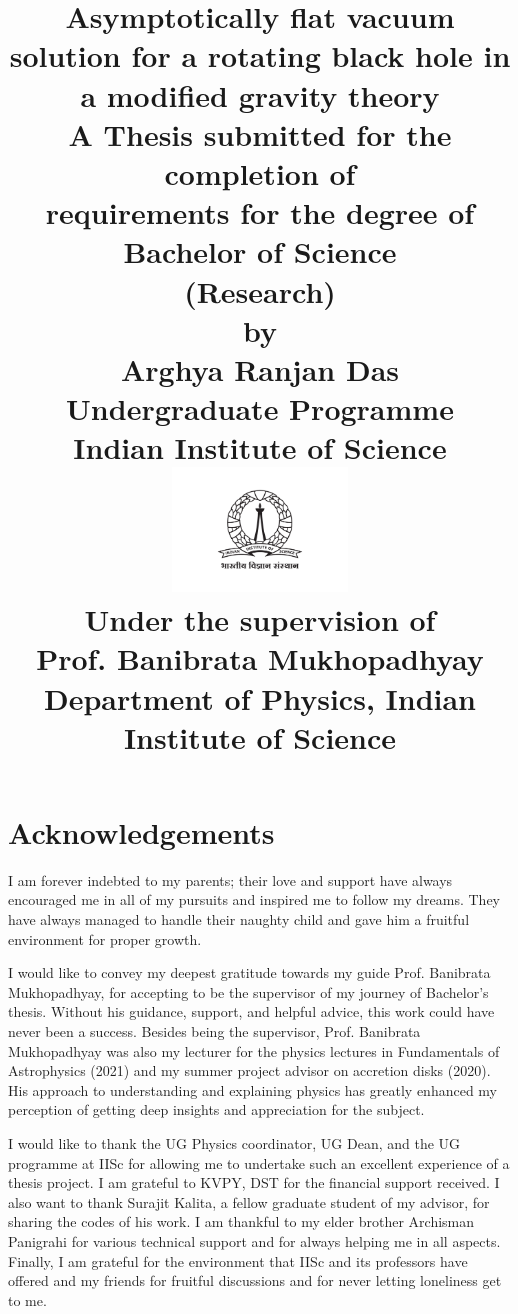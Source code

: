 \documentclass[12pt,a4paper,oneside]{book}
\title{
\sc
\Huge{Asymptotically flat vacuum solution for a rotating black hole in a modified  gravity theory}
\\[40pt]
\large{A Thesis submitted for the completion of}
\\[5pt]
\large{requirements for the degree of}
\\[15pt]
\Large{Bachelor of Science}
\\[5pt]
\Large{(Research)}
\\[20pt]
\normalsize{by}
\\[15pt]
\large{Arghya Ranjan Das}
\\[5pt]
\normalsize{Undergraduate Programme}
\\[5pt]
\normalsize{Indian Institute of Science}
\\[30pt]
\includegraphics[width=0.35\textwidth]{University_logo.pdf}
\\[40pt]
\normalsize{Under the supervision of}
\\[10pt]
\large{Prof. Banibrata Mukhopadhyay}\\
\normalsize{Department of Physics, Indian Institute of Science} \\[5pt]
\newpage
}
\author{}
\date{}
\begin{document}
\begin{titlepage}
\maketitle
\end{titlepage}
\frontmatter


\chapter*{\centering Acknowledgements}
    \hspace{15pt} 
      I am forever indebted to my parents; their love and support have always encouraged me in all of my pursuits and inspired me to follow my dreams. They have always managed to handle their naughty child and gave him a fruitful environment for proper growth.
    
    I would like to convey my deepest gratitude towards my guide Prof. Banibrata Mukhopadhyay, for accepting to be the supervisor of my journey of Bachelor's thesis. Without his guidance, support, and helpful advice, this work could have never been a success. Besides being the supervisor, Prof. Banibrata Mukhopadhyay was also my lecturer for the physics lectures in Fundamentals of Astrophysics (2021) and my summer project advisor on accretion disks (2020). His approach to understanding and explaining physics has greatly enhanced my perception of getting deep insights and appreciation for the subject.
    
    I would like to thank the UG Physics coordinator, UG Dean, and the UG programme at IISc for allowing me to undertake such an excellent experience of a thesis project. I am grateful to KVPY, DST for the financial support received. I also want to thank Surajit Kalita, a fellow graduate student of my advisor, for sharing the codes of his work. I am thankful to my elder brother Archisman Panigrahi for various technical support and for always helping me in all aspects. Finally, I am grateful for the environment that IISc and its professors have offered and my friends for fruitful discussions and for never letting loneliness get to me. 





\newpage
\end{document}
